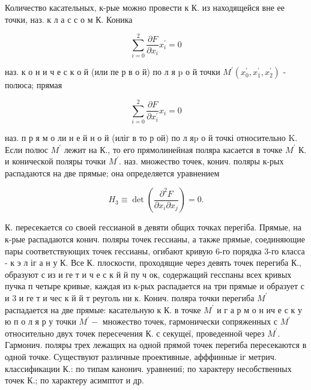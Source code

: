 \documentclass[10pt]{article}
\begin{document}
Количество касательных, к-рые можно провести к К. из находящейся вне ее точки, наз. к л а с с о м К. Коника



\[

\sum_{i=0}^{2} \frac{\partial F}{\partial x_{i}} x_{i}^{\prime}=0

\]



наз. к о н и ч е с к о й (или пе р в о й) по л я $\mathrm{p}$ о й точки $M^{\prime}\left(x_{0}^{\prime}, x_{1}^{\prime}, x_{2}^{\prime}\right)$ - полюса; прямая



\[

\sum_{i=0}^{2} \frac{\partial F}{\partial x_{i}^{\prime}} x_{i}=0

\]



наз. п р я м о ли н е й н о й (иліг в то р ой) по л я$\mathrm{p}$ о й точкі относительно $\mathrm{K}$. Если полюс $M^{\prime}$ лежит на К., то его прямолинейная поляра касается в точке $M^{\prime}$ К. и конической поляры точки $M^{\prime}$. наз. множество точек, конич. поляры к-рых распадаются на две прямые; она определяется уравнением



\[

H_{3} \equiv \operatorname{det}\left(\frac{\partial^{2} F}{\partial x_{i} \partial x_{j}}\right)=0 .

\]



К. пересекается со своей гессианой в девяти общих точках перегіба. Прямые, на к-рые распадаются конич. поляры точек гессианы, а также прямые, соединяющие пары соответствующих точек гессианы, огибают кривую 6-го порядка 3-го класса - к э л іг а н у К. Все К. плоскости, проходящие через девять точек перегиба К., образуют с из и ге т и ч е с к й й пу ч ок, содержащий гесспаны всех кривых пучка п четыре кривые, каждая из к-рых распадается на три прямые и образует с и 3 и ге т и чес к й й т реуголь ни к. Конич. поляра точки перегиба $M^{\prime}$ распадается на две прямые: касательную к К. в точке $M^{\prime}$ и г а р м о н ич е с к у ю п о л я р у точки $M^{\prime}-$ множество точек, гармонически сопряженных с $M^{\prime}$ относительно двух точек пересечения К. с секущеї, проведенной через $M^{\prime}$. Гармонич. поляры трех лежащих на одной прямой точек перегиба пересекаются в одной точке. Существуют различные проективные, афффинные іг метрич. классификации К.: по типам канонич. уравнениї; по характеру несобственных точек К.; по характеру асимптот и др.
\end{document}
